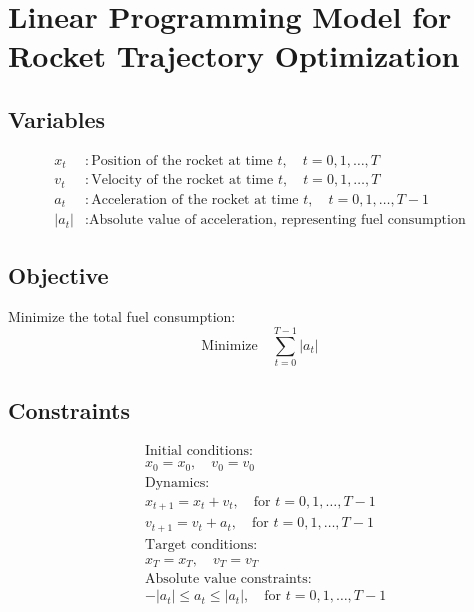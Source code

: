 \documentclass{article}
\begin{document}
\section*{Linear Programming Model for Rocket Trajectory Optimization}

\subsection*{Variables}
\begin{align*}
    x_t & : \text{Position of the rocket at time } t, \quad t = 0, 1, \dots, T \\
    v_t & : \text{Velocity of the rocket at time } t, \quad t = 0, 1, \dots, T \\
    a_t & : \text{Acceleration of the rocket at time } t, \quad t = 0, 1, \dots, T-1 \\
    |a_t| & : \text{Absolute value of acceleration, representing fuel consumption}
\end{align*}

\subsection*{Objective}
Minimize the total fuel consumption:
\[
\text{Minimize} \quad \sum_{t=0}^{T-1} |a_t|
\]

\subsection*{Constraints}
\begin{align*}
    & \text{Initial conditions:} \\
    & x_0 = x_0, \quad v_0 = v_0 \\
    & \text{Dynamics:} \\
    & x_{t+1} = x_t + v_t, \quad \text{for } t = 0, 1, \dots, T-1 \\
    & v_{t+1} = v_t + a_t, \quad \text{for } t = 0, 1, \dots, T-1 \\
    & \text{Target conditions:} \\
    & x_T = x_T, \quad v_T = v_T \\
    & \text{Absolute value constraints:} \\
    & -|a_t| \leq a_t \leq |a_t|, \quad \text{for } t = 0, 1, \dots, T-1
\end{align*}
\end{document}
